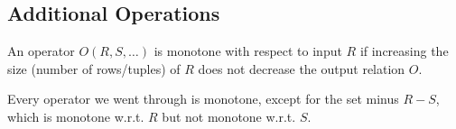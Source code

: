 \documentclass{article}
\begin{document}
  \subsection{Additional Operations}
    
    \begin{definition}
      An operator $O(R, S, \ldots)$ is monotone with respect to input $R$ if increasing the size (number of rows/tuples) of $R$ does not decrease the output relation $O$. 
    \end{definition}

    \begin{example}
      Every operator we went through is monotone, except for the set minus $R - S$, which is monotone w.r.t. $R$ but not monotone w.r.t. $S$. 
    \end{example}
\end{document}
